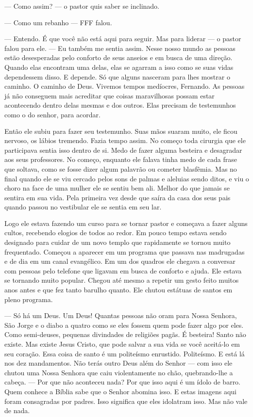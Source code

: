 --- Como assim? --- o pastor quis saber se inclinado.

--- Como um rebanho --- FFF falou.

--- Entendo. É que você não está aqui para seguir. Mas para liderar --- o pastor falou para ele. --- Eu também me sentia assim. Nesse nosso mundo as pessoas estão desesperadas pelo conforto de seus anseios e em busca de uma direção. Quando elas encontram uma delas, elas se agarram a isso como se suas vidas dependessem disso. E depende. Só que alguns nasceram para lhes mostrar o caminho. O caminho de Deus. Vivemos tempos medíocres, Fernando. As pessoas já não conseguem mais acreditar que coisas maravilhosas possam estar acontecendo dentro delas mesmas e dos outros. Elas precisam de testemunhos como o do senhor, para acordar.

Então ele subiu para fazer seu testemunho. Suas mãos suaram muito, ele ficou nervoso, os lábios tremendo. Fazia tempo  assim. No começo toda cirurgia que ele participava\mudanca{,} sentia isso dentro de si. Medo de fazer alguma besteira e desagradar aos seus professores. No começo, enquanto ele falava tinha medo de cada frase que soltava, como se fosse dizer algum palavrão ou cometer blasfêmia. Mas no final quando ele se viu cercado pelos sons de palmas e aleluias sendo ditos, e viu o choro na face de uma mulher\mudanca{,} ele se sentiu bem\mudanca{,} ali. Melhor do que jamais se sentira em sua vida. Pela primeira vez desde que saíra da casa dos seus pais\mudanca{,} quando passou no vestibular\mudanca{,} ele se sentia em seu lar.

Logo ele estava fazendo um curso para se tornar pastor e começava a fazer alguns cultos, recebendo elogios de todos ao redor. Em pouco tempo estava sendo designado para cuidar de um novo templo que rapidamente se tornou muito frequentado. Começou a aparecer em um programa que passava nas madrugadas e de dia em um canal evangélico. Em um dos quadros ele chegava a conversar com pessoas pelo telefone que ligavam em busca de conforto e ajuda. Ele estava se tornando muito popular. Chegou até mesmo a repetir um gesto feito muitos anos antes\mudanca{,} e que fez tanto barulho quanto. Ele chutou estátuas de santos em pleno programa.

--- Só há um Deus. Um Deus! Quantas pessoas não oram para Nossa Senhora, São Jorge e o diabo a quatro como se eles fossem quem pode fazer algo por eles. Como semi-deuses, pequenas divindades de religiões pagãs. É besteira! Santo não existe. Mas existe Jesus Cristo, que pode salvar a sua vida se você aceitá-lo em seu coração. Essa coisa de santo é um politeísmo enrustido. Politeísmo. E está lá nos dez mandamentos. Não terás outro Deus além do Senhor ---  com isso ele chutou uma Nossa Senhora que caiu violentamente no chão, quebrando-lhe a cabeça. --- Por que não aconteceu nada? Por que isso aqui é um ídolo de barro. Quem conhece a Bíblia sabe que o Senhor abomina isso. E estas imagens aqui foram consagradas por padres. Isso significa que eles idolatram isso. Mas não vale de nada.

